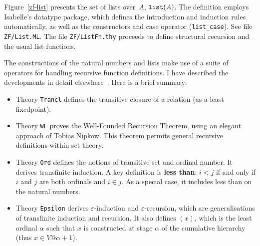 Figure~\ref{zf-list} presents the set of lists over~$A$, ${\tt list}(A)$.
The definition employs Isabelle's datatype package, which defines the
introduction and induction rules automatically, as well as the constructors
and case operator (\verb|list_case|).  See file \texttt{ZF/List.ML}.
The file \texttt{ZF/ListFn.thy} proceeds to define structural
recursion and the usual list functions.

The constructions of the natural numbers and lists make use of a suite of
operators for handling recursive function definitions.  I have described
the developments in detail elsewhere~\cite{paulson-set-II}.  Here is a brief
summary:
\begin{itemize}
  \item Theory \texttt{Trancl} defines the transitive closure of a relation
    (as a least fixedpoint).

  \item Theory \texttt{WF} proves the Well-Founded Recursion Theorem, using an
    elegant approach of Tobias Nipkow.  This theorem permits general
    recursive definitions within set theory.

  \item Theory \texttt{Ord} defines the notions of transitive set and ordinal
    number.  It derives transfinite induction.  A key definition is {\bf
      less than}: $i<j$ if and only if $i$ and $j$ are both ordinals and
    $i\in j$.  As a special case, it includes less than on the natural
    numbers.
    
  \item Theory \texttt{Epsilon} derives $\varepsilon$-induction and
    $\varepsilon$-recursion, which are generalisations of transfinite
    induction and recursion.  It also defines $(x)$, which
    is the least ordinal $\alpha$ such that $x$ is constructed at
    stage $\alpha$ of the cumulative hierarchy (thus $x\in
    V@{\alpha+1}$).
\end{itemize}

